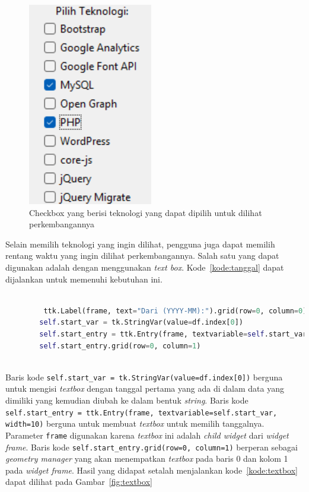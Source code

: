 \begin{figure} [H]
    \centering
    \includegraphics[width=0.25\linewidth]{Gambar/checkbox.png}
    \caption{Checkbox yang berisi teknologi yang dapat dipilih untuk dilihat perkembangannya}
    \label{fig:checkbox}
\end{figure}

Selain memilih teknologi yang ingin dilihat, pengguna juga dapat memilih rentang waktu yang ingin dilihat perkembangannya. Salah satu yang dapat digunakan adalah dengan menggunakan \textit{text box}. Kode~\ref{kode:tanggal} dapat dijalankan untuk memenuhi kebutuhan ini.

\begin{lstlisting}[language=Python, caption=Kode untuk menampilkan \textit{textbox} berisi tanggal, label=kode:textbox]

         ttk.Label(frame, text="Dari (YYYY-MM):").grid(row=0, column=0)
        self.start_var = tk.StringVar(value=df.index[0])
        self.start_entry = ttk.Entry(frame, textvariable=self.start_var, width=10)
        self.start_entry.grid(row=0, column=1)
    
\end{lstlisting}

Baris kode \verb|self.start_var = tk.StringVar(value=df.index[0])| berguna untuk mengisi \textit{textbox} dengan tanggal pertama yang ada di dalam data yang dimiliki yang kemudian diubah ke dalam bentuk \textit{string}. Baris kode \verb|self.start_entry = ttk.Entry(frame, textvariable=self.start_var, width=10)| berguna untuk membuat \textit{textbox} untuk memilih tanggalnya. Parameter \verb|frame| digunakan karena \textit{textbox} ini adalah \textit{child widget} dari \textit{widget frame}. Baris kode \verb|self.start_entry.grid(row=0, column=1)| berperan sebagai \textit{geometry manager} yang akan menempatkan \textit{textbox} pada baris 0 dan kolom 1 pada \textit{widget frame}. Hasil yang didapat setalah menjalankan kode~\ref{kode:textbox} dapat dilihat pada Gambar~\ref{fig:textbox}


